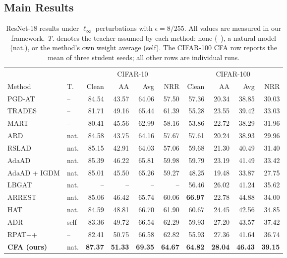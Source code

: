 \documentclass{article} %
\theoremstyle{plain}
\begin{document}
\subsection{Main Results}
\begin{table}[!htbp]
  \centering
  \footnotesize
  \setlength{\tabcolsep}{3.2pt}
  \caption{
  ResNet-18 results under \(\ell_\infty\) perturbations with
  \(\epsilon=8/255\). All values are measured in our framework.
  \emph{T.} denotes the teacher assumed by each method: none (--),
  a natural model (nat.), or the method's own weight average (self).
  The CIFAR-100 CFA row reports the mean of three student seeds;
  all other rows are individual runs.
  }
  \label{tab:main}
  \begin{tabular}{llrrrrrrrr}
    \toprule
    & & \multicolumn{4}{c}{CIFAR-10}
      & \multicolumn{4}{c}{CIFAR-100} \\
    \cmidrule(lr){3-6}\cmidrule(lr){7-10}
    Method & T. & Clean & AA & Avg & NRR
           & Clean & AA & Avg & NRR \\
    \midrule
    PGD-AT & -- & 84.54 & 43.57 & 64.06 & 57.50
                 & 57.36 & 20.34 & 38.85 & 30.03 \\
    TRADES & -- & 81.71 & 49.16 & 65.44 & 61.39
                 & 55.28 & 23.55 & 39.42 & 33.03 \\
    MART   & -- & 80.41 & 45.56 & 62.99 & 58.16
                 & 53.86 & 22.72 & 38.29 & 31.96 \\
    \midrule
    ARD & nat. & 84.58 & 43.75 & 64.16 & 57.67
               & 57.61 & 20.24 & 38.93 & 29.96 \\
    RSLAD & nat. & 85.15 & 42.91 & 64.03 & 57.06
                 & 59.68 & 21.30 & 40.49 & 31.40 \\
    AdaAD & nat. & 85.39 & 46.22 & 65.81 & 59.98
                 & 59.79 & 23.19 & 41.49 & 33.42 \\
    AdaAD + IGDM & nat. & 85.01 & 45.50 & 65.26 & 59.27
                        & 48.25 & 19.48 & 33.87 & 27.75 \\
    LBGAT & nat. & -- & -- & -- & --
                 & 56.46 & 26.02 & 41.24 & 35.62 \\
    ARREST & nat. & 85.06 & 46.42 & 65.74 & 60.06
                  & \textbf{66.97} & 22.78 & 44.88 & 34.00 \\
    \midrule
    HAT & nat. & 84.59 & 48.81 & 66.70 & 61.90
               & 60.67 & 24.45 & 42.56 & 34.85 \\
    ADR & self & 83.36 & 49.72 & 66.54 & 62.29
               & 59.93 & 27.20 & 43.57 & 37.42 \\
    RPAT++ & -- & 82.41 & 50.75 & 66.58 & 62.82
                  & 55.93 & 27.36 & 41.64 & 36.74 \\
    \midrule
    \textbf{CFA (ours)}
      & nat.
      & \textbf{87.37} & \textbf{51.33}
      & \textbf{69.35} & \textbf{64.67}
      & \textbf{64.82} & \textbf{28.04}
      & \textbf{46.43} & \textbf{39.15} \\
    \bottomrule
  \end{tabular}
\end{table}
\end{document}
